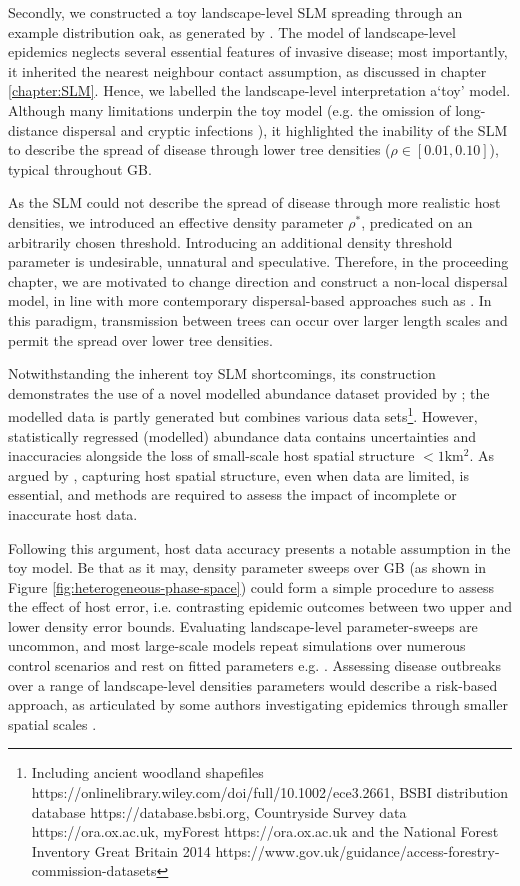 Secondly, we constructed a toy landscape-level SLM spreading through an example distribution oak, as generated by \cite{hill.data}.
The model of landscape-level epidemics neglects several essential features of invasive disease; most importantly, 
it inherited the nearest neighbour contact assumption, as discussed in chapter \ref{chapter:SLM}.
Hence, we labelled the landscape-level interpretation a`toy' model.
Although many limitations underpin the toy model (e.g. the omission of long-distance dispersal \cite{long-range-dispersal}
and cryptic infections \cite{gilligan2007impact}), it highlighted the inability of the SLM to describe the spread of disease
through lower tree densities ($\rho \in [0.01, 0.10]$), typical throughout GB.

As the SLM could not describe the spread of disease through more realistic host densities, 
we introduced an effective density parameter $\rho^*$, predicated on an arbitrarily chosen threshold.
Introducing an additional density threshold parameter is undesirable, unnatural and speculative.
Therefore, in the proceeding chapter, we are motivated to change direction and construct a non-local
dispersal model, in line with more contemporary dispersal-based approaches such as \cite{parnell2009optimal, meentemeyer2011epidemiological}.
In this paradigm, transmission between trees can occur over larger length scales and permit the spread over lower tree densities. 

Notwithstanding the inherent toy SLM shortcomings, its construction demonstrates the use of a novel modelled abundance
dataset provided by \cite{hill.data};
the modelled data is partly generated but combines various data sets\footnote{
Including ancient woodland shapefiles https://onlinelibrary.wiley.com/doi/full/10.1002/ece3.2661, BSBI distribution database https://database.bsbi.org, Countryside Survey data https://ora.ox.ac.uk, myForest https://ora.ox.ac.uk and the National Forest Inventory Great Britain 2014 https://www.gov.uk/guidance/access-forestry-commission-datasets}.
However, statistically regressed (modelled) abundance data contains uncertainties and 
inaccuracies alongside the loss of small-scale host spatial structure $<1\mathrm{km^2}$.
As argued by \cite{13-challenges}, capturing host spatial structure, even when data are limited, 
is essential, and methods are required to assess the impact of incomplete or inaccurate host data.

Following this argument, host data accuracy presents a notable assumption in the toy model.
Be that as it may, density parameter sweeps over GB (as shown in Figure \ref{fig:heterogeneous-phase-space}) could 
form a simple procedure to assess the effect of host error, i.e. contrasting epidemic outcomes between two upper
and lower density error bounds. Evaluating landscape-level parameter-sweeps are uncommon, 
and most large-scale models repeat simulations over numerous control scenarios and rest on 
fitted parameters e.g. \cite{large-scale-control, doi:10.1111/j.1365-3059.2010.02391.x}.
Assessing disease outbreaks over a range of landscape-level densities parameters would describe a risk-based approach,
as articulated by some authors investigating epidemics through smaller spatial scales \cite{risk-potential-control}.


\newpage